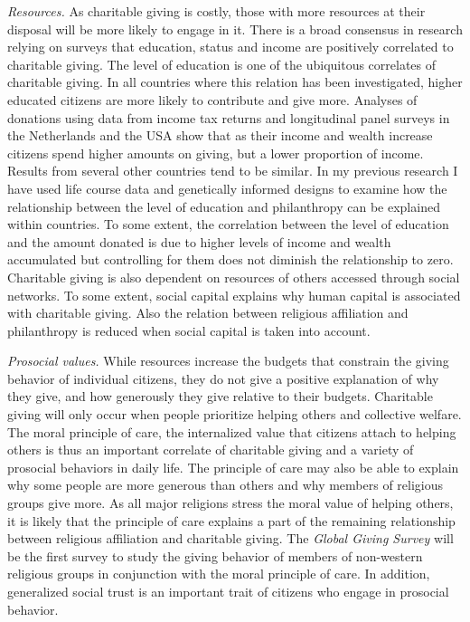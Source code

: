 \documentclass[twocolumn, serif, rga, numeric]{jote-article}
\begin{document}
\emph{Resources.} As charitable giving is costly, those with more resources at their disposal will be more likely to engage in it.\cite{Wilson1997} There is a broad consensus in research relying on surveys that education, status and income are positively correlated to charitable giving.\cite{Bekkers2011d, Korndorfer2015, Wiepking2012} The level of education is one of the ubiquitous correlates of charitable giving.
In all countries where this relation has been investigated, higher educated citizens are more likely to contribute and give more.\cite{Bekkers2011d} Analyses of donations using data from income tax returns and longitudinal panel surveys in the Netherlands and the USA show that as their income and wealth increase citizens spend higher amounts on giving, but a lower proportion of income.\cite{Bekkers2009, Duffy2015} Results from several other countries tend to be similar.\cite{Wiepking2012} In my previous research I have used life course data and genetically informed designs to examine how the relationship between the level of education and philanthropy can be explained within countries.\cite{Bekkers2014, Bekkers2008a} To some extent, the correlation between the level of education and the amount donated is due to higher levels of income and wealth accumulated\cite{Wiepking2009} but controlling for them does not diminish the relationship to zero.\cite{Bekkers2011d} Charitable giving is also dependent on resources of others accessed through social networks.\cite{Wiepking2009, Glanville2016} To some extent, social capital explains why human capital is associated with charitable giving.\cite{Wiepking2009} Also the relation between religious affiliation and philanthropy is reduced when social capital is taken into account.\cite{Bekkers2008}

\emph{Prosocial values.} While resources increase the budgets that constrain the giving behavior of individual citizens, they do not give a positive explanation of why they give, and how generously they give relative to their budgets. Charitable giving will only occur when people prioritize helping others and collective welfare. The moral principle of care, the internalized value that citizens attach to helping others \cite{Batson1994, Hoffman2000} is thus an important correlate of charitable giving and a variety of prosocial behaviors in daily life.\cite{Wilhelm2010} The principle of care may also be able to explain why some people are more generous than others and why members of religious groups give more. As all major religions stress the moral value of helping others, it is likely that the principle of care explains a part of the remaining relationship between religious affiliation and charitable giving. The \emph{Global Giving Survey} will be the first survey to study the giving behavior of members of non-western religious groups in conjunction with the moral principle of care. In addition, generalized social trust is an important trait of citizens who engage in prosocial behavior.\cite{Bekkers2003, Uslaner2010}
\end{document}
